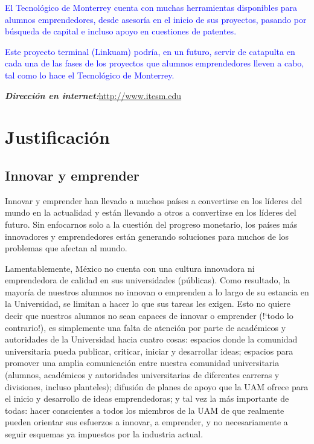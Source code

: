 \documentclass[11pt,letterpaper,titlepage]{article}
\begin{document}
\begin{itemize}
\textcolor{blue}{El Tecnol\'ogico de Monterrey cuenta con muchas herramientas disponibles para alumnos emprendedores, desde asesoría en el inicio de sus proyectos, pasando por b\'usqueda de capital e incluso apoyo en cuestiones de patentes.}

\textcolor{blue}{Este proyecto terminal (Linkuam) podr\'ia, en un futuro, servir de catapulta en cada una de las fases de los proyectos que alumnos emprendedores lleven a cabo, tal como lo hace el Tecnol\'ogico de Monterrey.}

\textit{\textbf{Direcci\'on en internet:}}\href{http://www.itesm.edu/wps/wcm/connect/ITESM/Tecnologico+de+Monterrey/Emprendimiento/#2}{http://www.itesm.edu}



\end{itemize}


\section{Justificaci\'on}
\subsection{Innovar y emprender}
Innovar y emprender han llevado a muchos pa\'ises a convertirse en los l\'ideres del mundo en la actualidad y est\'an llevando a otros a convertirse en los l\'ideres del futuro. Sin enfocarnos solo a la cuesti\'on del progreso monetario, los pa\'ises m\'as innovadores y emprendedores est\'an generando soluciones para muchos de los problemas que afectan al mundo.

Lamentablemente, M\'exico no cuenta con una cultura innovadora ni emprendedora de calidad en sus universidades (p\'ublicas). Como resultado, la mayor\'ia de nuestros alumnos no innovan o emprenden a lo largo de su estancia en la Universidad, se limitan a hacer lo que sus tareas les exigen. Esto no quiere decir que nuestros alumnos no sean capaces de innovar o emprender (!`todo lo contrario!), es simplemente una falta de atenci\'on por parte de acad\'emicos y autoridades de la Universidad hacia cuatro cosas: espacios donde la comunidad universitaria pueda publicar, criticar, iniciar y desarrollar ideas; espacios para promover una amplia comunicaci\'on entre nuestra comunidad universitaria (alumnos, acad\'emicos y autoridades universitarias de diferentes carreras y divisiones, incluso planteles); difusi\'on de planes de apoyo que la UAM ofrece para el inicio y desarrollo de ideas emprendedoras; y tal vez la m\'as importante de todas: hacer conscientes a todos los miembros de la UAM de que realmente pueden orientar sus esfuerzos a innovar, a emprender, y no necesariamente a seguir esquemas ya impuestos por la industria actual.
\end{document}
